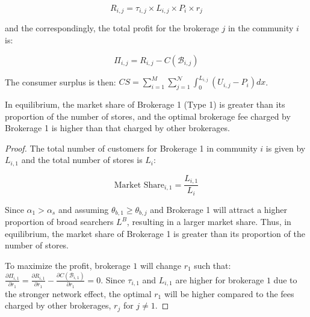 \begin{equation}
  R_{i, j} = \tau_{i, j} \times L_{i, j} \times P_i \times r_j \label{eq:revenue}
\end{equation}

and the correspondingly, the total profit for the brokerage $j$ in the community $i$ is:

\begin{equation}
  \Pi_{i, j} = R_{i, j} - C(\mathcal{B}_{i, j}) \label{eq:profit}
\end{equation}

The consumer surplus is then: $CS = \sum_{i=1}^M \sum_{j=1}^{\mathcal{N}} \int_0^{L_{i, j}} (U_{i, j} - P_i) dx$.


\begin{proposition}
  In equilibrium, the market share of Brokerage 1 (Type 1) is greater than its proportion of the number of stores, and the optimal brokerage fee charged by Brokerage 1 is higher than that charged by other brokerages. 
\end{proposition}

\begin{proof}
  The total number of customers for Brokerage 1 in community $i$ is given by $L_{i, 1}$ and the total number of stores is $L_{i}$:

  \begin{equation}
    \text{Market Share}_{i, 1} = \frac{L_{i, 1}}{L_i}
  \end{equation}
  
  Since $\alpha_1 > \alpha_s$ and assuming $\theta_{b, 1} \geq \theta_{b, j}$ and Brokerage 1 will attract a higher proportion of broad searchers $L^B$, resulting in a larger market share. Thus, in equilibrium, the market share of Brokerage 1 is greater than its proportion of the number of stores.

  To maximize the profit, brokerage $1$ will change $r_1$ such that: $\frac{\partial \Pi_{i, 1}}{\partial r_1} = \frac{\partial R_{i, 1}}{\partial r_1} - \frac{\partial C(\mathcal{B}_{i, 1})}{\partial r_{1}} = 0$. Since $\tau_{i, 1}$ and $L_{i, 1}$ are higher for brokerage $1$ due to the stronger network effect, the optimal $r_1$ will be higher compared to the fees charged by other brokerages, $r_j$ for $j \neq 1$.
\end{proof}

